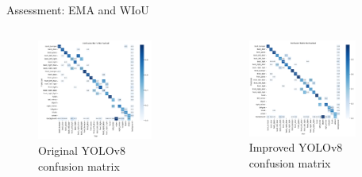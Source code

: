 \begin{frame}{Assessment: EMA and WIoU}
	\begin{columns}
		\begin{column}{0.5\textwidth}
			\begin{figure}[h]
				\centering
				\includegraphics[width=0.87\textwidth]{images/confusion_origin.png}
				\caption{Original YOLOv8 confusion matrix}
				\label{fig:confusion_origin}
			\end{figure}
		\end{column}
		\begin{column}{0.5\textwidth}
			\begin{figure}[h]
				\centering
				\includegraphics[width=0.85\textwidth]{images/confusion_improve.png}
				\caption{Improved YOLOv8 confusion matrix}
				\label{fig:confusion_improve}
			\end{figure}
		\end{column}
	\end{columns}
\end{frame}


